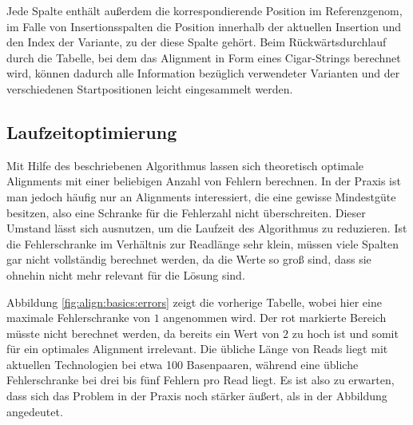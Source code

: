 Jede Spalte enthält außerdem die korrespondierende Position im Referenzgenom, im Falle von Insertionsspalten die Position innerhalb der aktuellen Insertion und den Index der Variante, zu der diese Spalte gehört. Beim Rückwärtsdurchlauf durch die Tabelle, bei dem das Alignment in Form eines Cigar-Strings berechnet wird, können dadurch alle Information bezüglich verwendeter Varianten und der verschiedenen Startpositionen leicht eingesammelt werden.

\subsection{Laufzeitoptimierung}
\label{sec:align:variants:optimize}

Mit Hilfe des beschriebenen Algorithmus lassen sich theoretisch optimale Alignments mit einer beliebigen Anzahl von Fehlern berechnen. In der Praxis ist man jedoch häufig nur an Alignments interessiert, die eine gewisse Mindestgüte besitzen, also \zB eine Schranke für die Fehlerzahl nicht überschreiten. Dieser Umstand lässt sich ausnutzen, um die Laufzeit des Algorithmus zu reduzieren. Ist die Fehlerschranke im Verhältnis zur Readlänge sehr klein, müssen viele Spalten gar nicht vollständig berechnet werden, da die Werte so groß sind, dass sie ohnehin nicht mehr relevant für die Lösung sind.

Abbildung \ref{fig:align:basics:errors} zeigt die vorherige Tabelle, wobei hier eine maximale Fehlerschranke von $1$ angenommen wird. Der rot markierte Bereich müsste nicht berechnet werden, da bereits ein Wert von $2$ zu hoch ist und somit für ein optimales Alignment irrelevant. Die übliche Länge von Reads liegt mit aktuellen Technologien bei etwa 100 Basenpaaren, während eine übliche Fehlerschranke bei drei bis fünf Fehlern pro Read liegt. Es ist also zu erwarten, dass sich das Problem in der Praxis noch stärker äußert, als in der Abbildung angedeutet.


